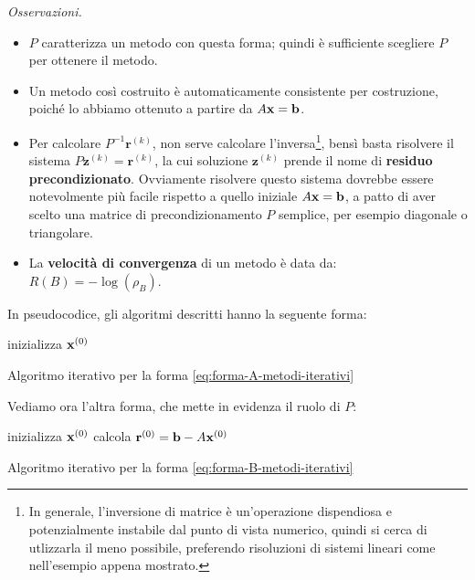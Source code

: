 \textit{Osservazioni.}
\begin{itemize}
\item $P$ caratterizza un metodo con questa forma; quindi è sufficiente scegliere $P$ per ottenere il metodo.
\item Un metodo così costruito è automaticamente consistente per costruzione, poiché lo abbiamo ottenuto a partire da $A\mathbf{x} =\mathbf{b}$.
\item Per calcolare $P^{-1}\mathbf{r}^{(k)}$, non serve calcolare l'inversa\footnote{In generale, l'inversione di matrice è un'operazione dispendiosa e potenzialmente instabile dal punto di vista numerico, quindi si cerca di utlizzarla il meno possibile, preferendo risoluzioni di sistemi lineari come nell'esempio appena mostrato.}, bensì basta risolvere il sistema $P\mathbf{z}^{(k)} =\mathbf{r}^{(k)}$, la cui soluzione $\mathbf{z}^{(k)}$ prende il nome di \textbf{residuo precondizionato}.
Ovviamente risolvere questo sistema dovrebbe essere notevolmente più facile rispetto a quello iniziale $A\mathbf{x} =\mathbf{b}$, a patto di aver scelto una matrice di precondizionamento $P$ semplice, per esempio diagonale o triangolare.
\item La \textbf{velocità di convergenza} di un metodo è data da: $R(B) =-\log( \rho _{B})$.
\end{itemize}

In pseudocodice, gli algoritmi descritti hanno la seguente forma: \\
\begin{algo}
	inizializza $\mathbf{x}^{(0)}$\;
	\caption{Algoritmo iterativo per la forma \eqref{eq:forma-A-metodi-iterativi}}
\end{algo}
Vediamo ora l'altra forma, che mette in evidenza il ruolo di $P$: \\
\begin{algo}
	inizializza $\mathbf{x}^{(0)}$\;
	calcola $\mathbf{r}^{(0)} =\mathbf{b} -A\mathbf{x}^{(0)}$\;
	\caption{Algoritmo iterativo per la forma \eqref{eq:forma-B-metodi-iterativi}}
\end{algo}

